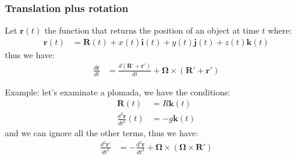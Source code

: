 \documentclass{article}
\begin{document}
\subsubsection*{Translation plus rotation}
Let $\bm{r}(t)$ the function that returns the position of an object at time $t$ where:
\begin{align*}
    \bm{r}(t) 
    &= \bm{R}(t) + x(t)\bm{i}(t) + y(t)\bm{j}(t) + z(t)\bm{k}(t)
\end{align*}
thus we have:
\begin{align*}
    \frac{d\bm{r}}{dt} 
    &= \frac{d (\bm{R'+r'})}{dt} + \bm{\Omega} \times (\bm{R'} + \bm{r'})
\end{align*}
\begin{tcolorbox}
    Example: let's examinate a plomada, we have the conditions:
    \begin{align*}
        \bm{R}(t) &= R\bm{k}(t) \\
        \frac{d^2\bm{r}}{dt^2}(t) &= -g\bm{k}(t) 
    \end{align*}
    and we can ignore all the other terms, thus we have:
    \begin{align*}
        \frac{d^2\bm{r'}}{dt^2}
        &= -\frac{d^2\bm{r}}{dt^2} + \bm{\Omega} \times (\bm{\Omega} \times \bm{R'})
    \end{align*}
\end{tcolorbox}
\end{document}
